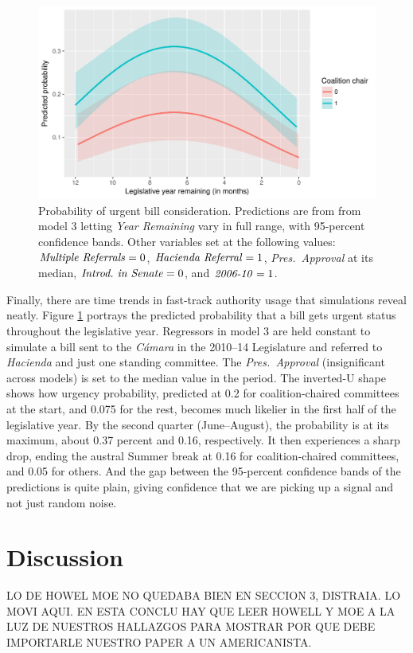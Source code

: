 \documentclass[letter,12pt]{article}
\begin{document}
\begin{figure}
  \centering
    \caption{Probability of urgent bill consideration. Predictions are from from model 3 letting \emph{Year Remaining} vary in full range, with 95-percent confidence bands. Other variables set at the following values: $\text{\emph{Multiple Referrals}}=0$, $\text{\emph{Hacienda Referral}}=1$, \emph{Pres.~Approval} at its median, $\text{\emph{Introd.~in~Senate}}=0$, and $\text{\emph{2006-10}}=1$.}\label{F:sims}
    \includegraphics[width=.75\columnwidth]{../graphs/predictedPr.pdf}
\end{figure}

Finally, there are time trends in fast-track authority usage that simulations reveal neatly. Figure \ref{F:sims} portrays the predicted probability that a bill gets urgent status throughout the legislative year. Regressors in model 3 are held constant to simulate a bill sent to the \emph{Cámara} in the 2010--14 Legislature and referred to \emph{Hacienda} and just one standing committee. The \emph{Pres.~Approval} (insignificant across models) is set to the median value in the period. The inverted-U shape shows how urgency probability, predicted at 0.2 for coalition-chaired committees at the start, and 0.075 for the rest, becomes much likelier in the first half of the legislative year. By the second quarter (June--August), the probability is at its maximum, about 0.37 percent and 0.16, respectively. It then experiences a sharp drop, ending the austral Summer break at 0.16 for coalition-chaired committees, and 0.05 for others. And the gap between the 95-percent confidence bands of the predictions is quite plain, giving confidence that we are picking up a signal and not just random noise. 

\section{Discussion}

LO DE HOWEL MOE NO QUEDABA BIEN EN SECCION 3, DISTRAIA. LO MOVI AQUI. EN ESTA CONCLU HAY QUE LEER HOWELL Y MOE A LA LUZ DE NUESTROS HALLAZGOS PARA MOSTRAR POR QUE DEBE IMPORTARLE NUESTRO PAPER A UN AMERICANISTA.
\end{document}
